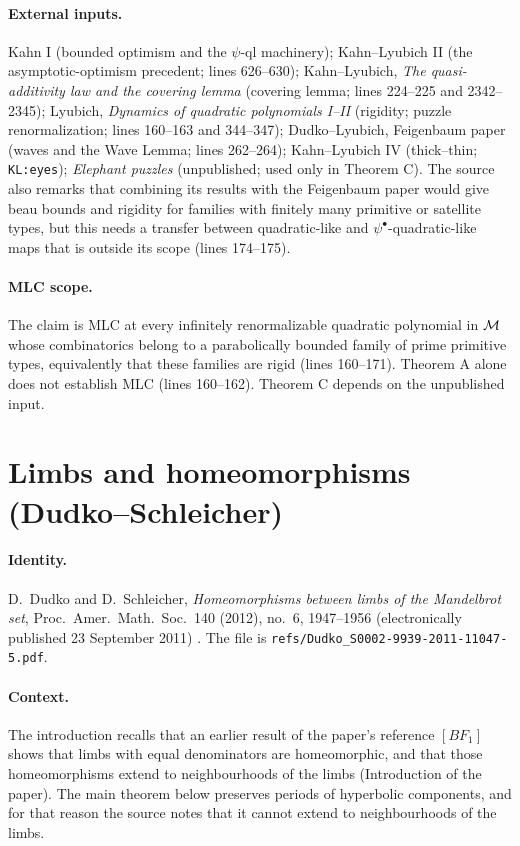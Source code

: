 \paragraph{External inputs.}
Kahn I (bounded optimism and the $\psi$-ql machinery); Kahn--Lyubich II (the asymptotic-optimism precedent; lines 626--630);
Kahn--Lyubich, \emph{The quasi-additivity law and the covering lemma} (covering lemma; lines 224--225 and 2342--2345);
Lyubich, \emph{Dynamics of quadratic polynomials I--II} (rigidity; puzzle renormalization; lines 160--163 and 344--347);
Dudko--Lyubich, Feigenbaum paper (waves and the Wave Lemma; lines 262--264); Kahn--Lyubich IV (thick--thin; \texttt{KL:eyes});
\emph{Elephant puzzles} (unpublished; used only in Theorem C).  The source also remarks that combining its results with the
Feigenbaum paper would give beau bounds and rigidity for families with finitely many primitive or satellite types, but this
needs a transfer between quadratic-like and $\psi^\bullet$-quadratic-like maps that is outside its scope (lines 174--175).

\paragraph{MLC scope.}
The claim is MLC at every infinitely renormalizable quadratic polynomial in $\mathcal M$ whose combinatorics belong to a parabolically
bounded family of prime primitive types, equivalently that these families are rigid (lines 160--171).  Theorem A alone does
not establish MLC (lines 160--162).  Theorem C depends on the unpublished input.

\section{Limbs and homeomorphisms (Dudko--Schleicher)}
\label{sec:dudko-schleicher}

\paragraph{Identity.}
D.~Dudko and D.~Schleicher, \emph{Homeomorphisms between limbs of the Mandelbrot set}, Proc.\ Amer.\ Math.\ Soc.\ 140
(2012), no.~6, 1947--1956 (electronically published 23 September 2011) \cite{DudkoSchleickerLimbs}.  The file is
\texttt{refs/Dudko\_S0002-9939-2011-11047-5.pdf}.

\paragraph{Context.}
The introduction recalls that an earlier result of the paper's reference $[BF_1]$ shows that limbs with equal denominators
are homeomorphic, and that those homeomorphisms extend to neighbourhoods of the limbs (Introduction of the paper).
The main theorem below preserves periods of hyperbolic components, and for that reason the source notes that it cannot extend
to neighbourhoods of the limbs.

